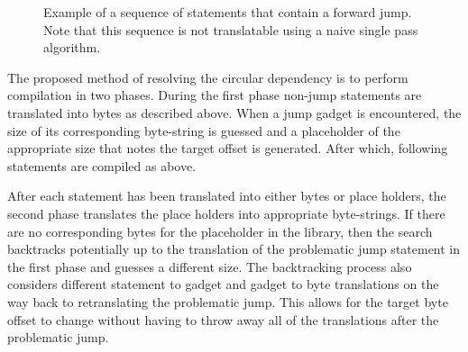     \begin{figure}
        \centering
        \caption[Example of a sequence of statements that contain a forward
        jump.]{Example of a sequence of statements that contain a forward
        jump. Note that this sequence is not translatable using a naive single
        pass algorithm.}
        \label{fig:method-forward-jump}
    \end{figure}

    The proposed method of resolving the circular dependency is to perform
    compilation in two phases. During the first phase non-jump statements are
    translated into bytes as described above. When a jump gadget is encountered,
    the size of its corresponding byte-string is guessed and a placeholder of
    the appropriate size that notes the target offset is generated. After which,
    following statements are compiled as above.

    After each statement has been translated into either bytes or place holders,
    the second phase translates the place holders into appropriate byte-strings.
    If there are no corresponding bytes for the placeholder in the library, then
    the search backtracks potentially up to the translation of the problematic
    jump statement in the first phase and guesses a different size. The
    backtracking process also considers different statement to gadget and gadget
    to byte translations on the way back to retranslating the problematic jump.
    This allows for the target byte offset to change without having to throw
    away all of the translations after the problematic jump.

